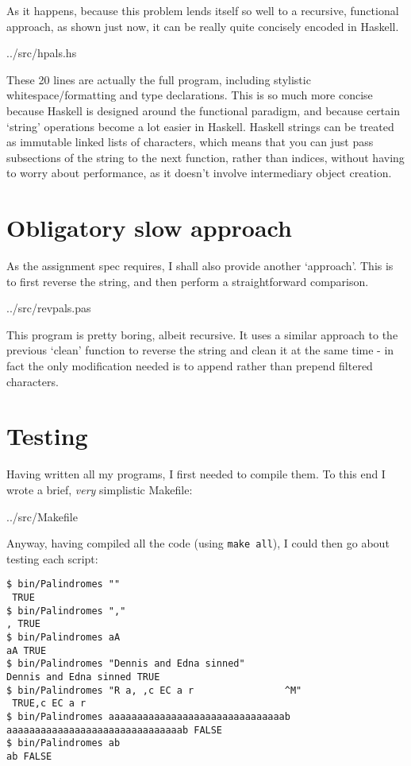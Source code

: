 \documentclass[fleqn,a4paper,11pt]{article}
\begin{document}
    As it happens, because this problem lends itself so well to a recursive,
    functional approach, as shown just now, it can be really quite concisely
    encoded in Haskell.


{../src/hpals.hs}

    These 20 lines are actually the full program, including stylistic
    whitespace/formatting and type declarations. This is so much more concise
    because Haskell is designed around the functional paradigm, and because
    certain `string' operations become a lot easier in Haskell. Haskell strings
    can be treated as immutable linked lists of characters, which means that you
    can just pass subsections of the string to the next function, rather than
    indices, without having to worry about performance, as it doesn't involve
    intermediary object creation.

    \section{Obligatory slow approach}

    As the assignment spec requires, I shall also provide another `approach'.
    This is to first reverse the string, and then perform a straightforward
    comparison.


{../src/revpals.pas}

    This program is pretty boring, albeit recursive. It uses a similar approach
    to the previous `clean' function to reverse the string and clean it at the
    same time - in fact the only modification needed is to append rather than
    prepend filtered characters.

    \section{Testing}

    Having written all my programs, I first needed to compile them. To this end
    I wrote a brief, \emph{very} simplistic Makefile:


{../src/Makefile}

    Anyway, having compiled all the code (using \texttt{make all}), I could then
    go about testing each script:

\begin{lstlisting}[caption=Initial testing]
$ bin/Palindromes ""
 TRUE
$ bin/Palindromes ","
, TRUE
$ bin/Palindromes aA
aA TRUE
$ bin/Palindromes "Dennis and Edna sinned"
Dennis and Edna sinned TRUE
$ bin/Palindromes "R a, ,c EC a r                ^M"
 TRUE,c EC a r
$ bin/Palindromes aaaaaaaaaaaaaaaaaaaaaaaaaaaaaaab
aaaaaaaaaaaaaaaaaaaaaaaaaaaaaaab FALSE
$ bin/Palindromes ab
ab FALSE
\end{lstlisting}
\end{document}
